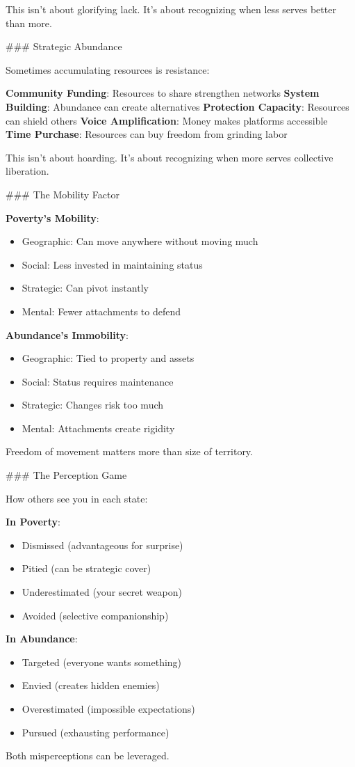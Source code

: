 \documentclass[12pt]{book}
\begin{document}
This isn't about glorifying lack. It's about recognizing when less serves better than more.

\#\#\# Strategic Abundance

Sometimes accumulating resources is resistance:

\textbf{Community Funding}: Resources to share strengthen networks
\textbf{System Building}: Abundance can create alternatives
\textbf{Protection Capacity}: Resources can shield others
\textbf{Voice Amplification}: Money makes platforms accessible
\textbf{Time Purchase}: Resources can buy freedom from grinding labor

This isn't about hoarding. It's about recognizing when more serves collective liberation.

\#\#\# The Mobility Factor

\textbf{Poverty's Mobility}:
\begin{itemize}
\item Geographic: Can move anywhere without moving much
\item Social: Less invested in maintaining status
\item Strategic: Can pivot instantly
\item Mental: Fewer attachments to defend

\end{itemize}
\textbf{Abundance's Immobility}:
\begin{itemize}
\item Geographic: Tied to property and assets
\item Social: Status requires maintenance
\item Strategic: Changes risk too much
\item Mental: Attachments create rigidity

\end{itemize}
Freedom of movement matters more than size of territory.

\#\#\# The Perception Game

How others see you in each state:

\textbf{In Poverty}:
\begin{itemize}
\item Dismissed (advantageous for surprise)
\item Pitied (can be strategic cover)
\item Underestimated (your secret weapon)
\item Avoided (selective companionship)

\end{itemize}
\textbf{In Abundance}:
\begin{itemize}
\item Targeted (everyone wants something)
\item Envied (creates hidden enemies)
\item Overestimated (impossible expectations)
\item Pursued (exhausting performance)

\end{itemize}
Both misperceptions can be leveraged.
\end{document}
